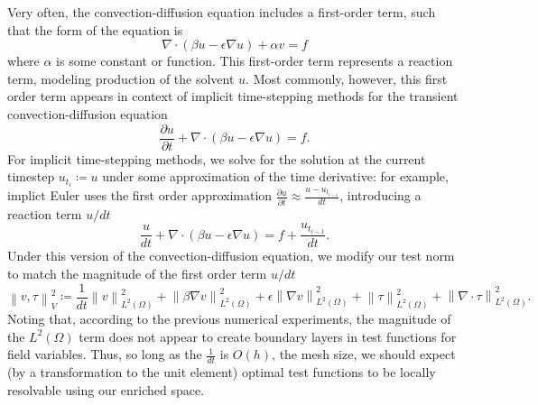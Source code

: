 \documentclass[11pt,onecolumn]{scrartcl}
\newcommand{\nor}[1]{\left\| #1 \right\|}
\newcommand{\LRp}[1]{\left( #1 \right)}
\renewcommand{\L}{L^2\LRp{\Omega}}
\newcommand{\grad}{\nabla}
\renewcommand{\div}{\grad \cdot}
\newcommand{\pd}[2]{\frac{\partial#1}{\partial#2}}
\begin{document}
Very often, the convection-diffusion equation includes a first-order term, such that the form of the equation is
\[
\div\LRp{\beta u - \epsilon \grad u} + \alpha v = f
\]
where $\alpha$ is some constant or function.
This first-order term represents a reaction term, modeling production of the solvent $u$.  Most commonly, however, this first order term appears in context of implicit time-stepping methods for the transient convection-diffusion equation
\[
\pd{u}{t}+\div\LRp{\beta u - \epsilon \grad u} = f.
\]
For implicit time-stepping methods, we solve for the solution at the current timestep $u_{t_i} \coloneqq u$ under some approximation of the time derivative: for example, implict Euler uses the first order approximation $\pd{u}{t} \approx \frac{u-u_{t_{i-1}}}{dt}$, introducing a reaction term $u/dt$
\[
\frac{u}{dt}+\div\LRp{\beta u - \epsilon \grad u} = f + \frac{u_{t_{i-1}}}{dt}.
\]
Under this version of the convection-diffusion equation, we modify our test norm to match the magnitude of the first order term $u/dt$
\[
\nor{v,\tau}_V^2 \coloneqq \frac{1}{dt}\nor{v}_{\L}^2 + \nor{\beta\grad v}_{\L}^2 + \epsilon \nor{\grad v}_{\L}^2 + \nor{\tau}_{\L}^2 + \nor{\div \tau}_{\L}^2.
\]
Noting that, according to the previous numerical experiments, the magnitude of the $\L$ term does not appear to create boundary layers in test functions for field variables.  Thus, so long as the $\frac{1}{dt}$ is $O(h)$, the mesh size, we should expect (by a transformation to the unit element) optimal test functions to be locally resolvable using our enriched space.
\end{document}
